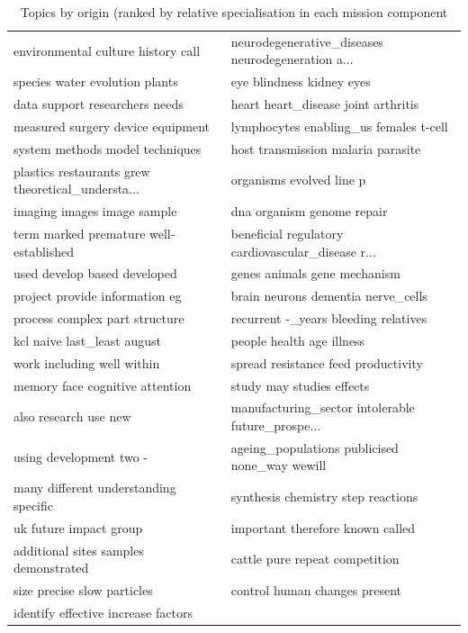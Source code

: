 \documentclass[11pt]{article}
\begin{document}
\begin{table}
\begin{tabular}{ll}
                environmental culture history call &  neurodegenerative\_diseases neurodegeneration a... \\
                    species water evolution plants &                          eye blindness kidney eyes \\
                    data support researchers needs &                heart heart\_disease joint arthritis \\
                 measured surgery device equipment &             lymphocytes enabling\_us females t-cell \\
                   system methods model techniques &                 host transmission malaria parasite \\
 plastics restaurants grew theoretical\_understa... &                           organisms evolved line p \\
                       imaging images image sample &                         dna organism genome repair \\
            term marked premature well-established &  beneficial regulatory cardiovascular\_disease r... \\
                      used develop based developed &                       genes animals gene mechanism \\
                    project provide information eg &                 brain neurons dementia nerve\_cells \\
                    process complex part structure &               recurrent -\_years bleeding relatives \\
                       kcl naive last\_least august &                          people health age illness \\
                        work including well within &                spread resistance feed productivity \\
                   memory face cognitive attention &                          study may studies effects \\
                             also research use new &  manufacturing\_sector intolerable future\_prospe... \\
                           using development two - &   ageing\_populations publicised none\_way wewill \\
             many different understanding specific &                 synthesis chemistry step reactions \\
                            uk future impact group &                   important therefore known called \\
             additional sites samples demonstrated &                     cattle pure repeat competition \\
                       size precise slow particles &                      control human changes present \\
               identify effective increase factors &                                                    \\
\hline
\bottomrule
\end{tabular}
\caption{Topics by origin (ranked by relative specialisation in each mission component}
\end{table}
\end{document}

